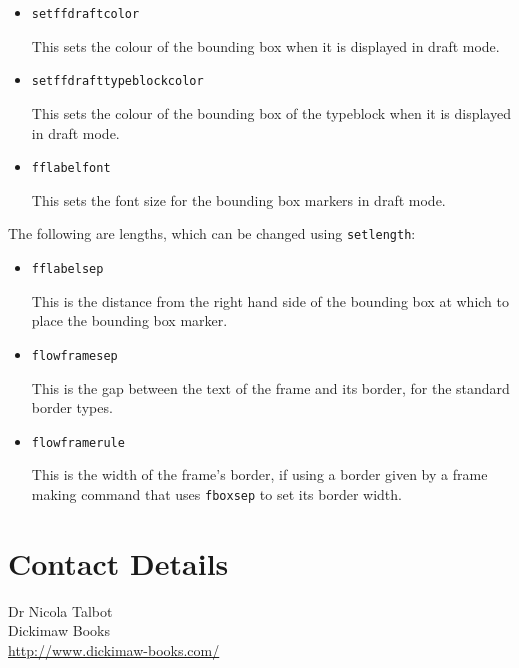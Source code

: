 \documentclass[a4paper]{article}\usepackage[]{graphicx}\usepackage[]{color}
\newcommand{\cmdname}[1]{\texttt{\symbol{92}#1}}
\begin{document}
\begin{itemize}
\item \cmdname{setffdraftcolor}

This sets the colour of the bounding box
when it is displayed in draft mode.

\item
\cmdname{setffdrafttypeblockcolor}

This sets the colour of
the bounding box of the typeblock when it is displayed
in draft mode.

\item \cmdname{fflabelfont}

This sets the font size for the bounding box markers in
draft mode.

\end{itemize}

The following are lengths, which can be changed using
\cmdname{setlength}:

\begin{itemize}
\item \cmdname{fflabelsep}

This is the distance from the right hand side of the
bounding box at which to place the bounding box marker.

\item \cmdname{flowframesep}

This is the gap between the text of the frame and
its border, for the standard border types.

\item \cmdname{flowframerule}

This is the width of the frame's border, if using
a border given by a frame making command that uses \cmdname{fboxsep}
to set its border width.
\end{itemize}

\section*{Contact Details}

Dr Nicola Talbot\\
Dickimaw Books\\
\url{http://www.dickimaw-books.com/}
\end{document}
